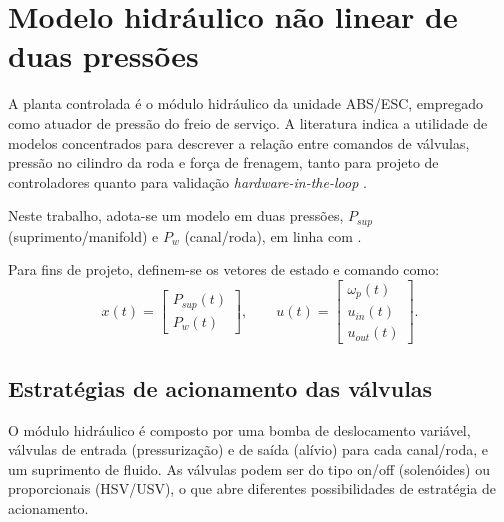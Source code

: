 \section{Modelo hidráulico não linear de duas pressões}
\label{sec:controle-4-1}
A planta controlada é o módulo hidráulico da unidade ABS/ESC, empregado como atuador de pressão do freio de serviço. A literatura indica a utilidade de modelos concentrados para descrever a relação entre comandos de válvulas, pressão no cilindro da roda e força de frenagem, tanto para projeto de controladores quanto para validação \emph{hardware-in-the-loop} \cite{HouhuaJing2022,PressureCoordinatedControl2023,ZengYangHuang2023,MotorParametricDesign2023}.

Neste trabalho, adota-se um modelo em duas pressões, $P_{sup}$ (suprimento/manifold) e $P_w$ (canal/roda), em linha com .

Para fins de projeto, definem-se os vetores de estado e comando como:
\begin{equation}
    x(t) =
    \begin{bmatrix}
        P_{sup}(t) \\[2pt]
        P_{w}(t)
    \end{bmatrix},
    \qquad
    u(t) =
    \begin{bmatrix}
        \omega_p(t) \\[2pt]
        u_{in}(t)   \\[2pt]
        u_{out}(t)
    \end{bmatrix}.
    \label{eq:vect-estados-hidraulico}
\end{equation}


\subsection{Estratégias de acionamento das válvulas}
\label{sec:controle-4-1-1}

O módulo hidráulico é composto por uma bomba de deslocamento variável, válvulas de entrada (pressurização) e de saída (alívio) para cada canal/roda, e um suprimento de fluido. As válvulas podem ser do tipo on/off (solenóides) ou proporcionais (HSV/USV), o que abre diferentes possibilidades de estratégia de acionamento.


